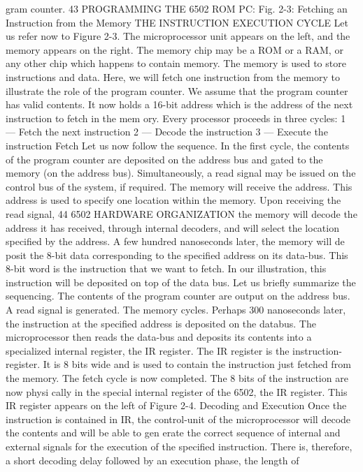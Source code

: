 \documentclass{book}
\begin{document}
gram counter.
43
PROGRAMMING THE 6502
ROM
PC:
Fig. 2-3: Fetching an Instruction from the Memory
THE INSTRUCTION EXECUTION CYCLE
Let us refer now to Figure 2-3. The microprocessor unit appears
on the left, and the memory appears on the right. The memory
chip may be a ROM or a RAM, or any other chip which happens to
contain memory. The memory is used to store instructions and
data. Here, we will fetch one instruction from the memory to
illustrate the role of the program counter. We assume that the
program counter has valid contents. It now holds a 16-bit address
which is the address of the next instruction to fetch in the mem
ory. Every processor proceeds in three cycles:
1 — Fetch the next instruction
2 — Decode the instruction
3 — Execute the instruction
Fetch
Let us now follow the sequence. In the first cycle, the contents of
the program counter are deposited on the address bus and gated
to the memory (on the address bus). Simultaneously, a read signal
may be issued on the control bus of the system, if required. The
memory will receive the address. This address is used to specify
one location within the memory. Upon receiving the read signal,
44
6502 HARDWARE ORGANIZATION
the memory will decode the address it has received, through
internal decoders, and will select the location specified by the
address. A few hundred nanoseconds later, the memory will de
posit the 8-bit data corresponding to the specified address on its
data-bus. This 8-bit word is the instruction that we want to fetch.
In our illustration, this instruction will be deposited on top of the
data bus.
Let us briefly summarize the sequencing. The contents of the
program counter are output on the address bus. A read signal is
generated. The memory cycles. Perhaps 300 nanoseconds later,
the instruction at the specified address is deposited on the databus.
The microprocessor then reads the data-bus and deposits its
contents into a specialized internal register, the IR register. The
IR register is the instruction-register. It is 8 bits wide and is used
to contain the instruction just fetched from the memory. The fetch
cycle is now completed. The 8 bits of the instruction are now physi
cally in the special internal register of the 6502, the IR register.
This IR register appears on the left of Figure 2-4.
Decoding and Execution
Once the instruction is contained in IR, the control-unit of the
microprocessor will decode the contents and will be able to gen
erate the correct sequence of internal and external signals for the
execution of the specified instruction. There is, therefore, a short
decoding delay followed by an execution phase, the length of
\end{document}

